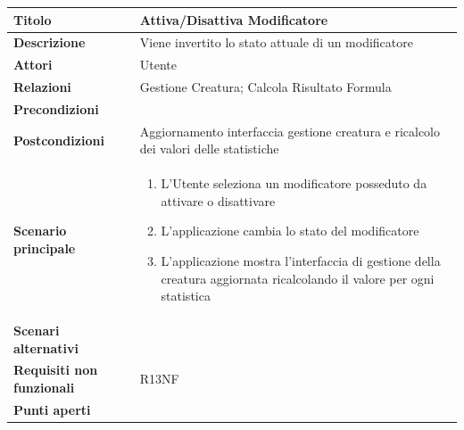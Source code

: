 \documentclass[a4paper, 11pt]{article}
\begin{document}
\begin{center}
\begin{tabular}{ |p{5cm}|p{9.5cm}|  }
\hline
\textbf{Titolo} & Attiva/Disattiva Modificatore \\
\hline
\textbf{Descrizione} & Viene invertito lo stato attuale di un modificatore\\
\hline
\textbf{Attori} & Utente \\
\hline
\textbf{Relazioni} & Gestione Creatura; Calcola Risultato Formula \\
\hline
\textbf{Precondizioni} & \\
\hline
\textbf{Postcondizioni} & Aggiornamento interfaccia gestione creatura e ricalcolo dei valori delle statistiche \\
\hline
\textbf{Scenario principale} & 
\begin{enumerate}
    \item L'Utente seleziona un modificatore posseduto da attivare o disattivare
    \item L'applicazione cambia lo stato del modificatore 
    \item L'applicazione mostra l'interfaccia di gestione della creatura aggiornata ricalcolando il valore per ogni statistica
\end{enumerate}\\
\hline
\textbf{Scenari alternativi} & \\
\hline
\textbf{Requisiti non funzionali} & R13NF\\
\hline
\textbf{Punti aperti} & \\
\hline
\end{tabular}

\vspace{3em}


\end{center}
\end{document}
